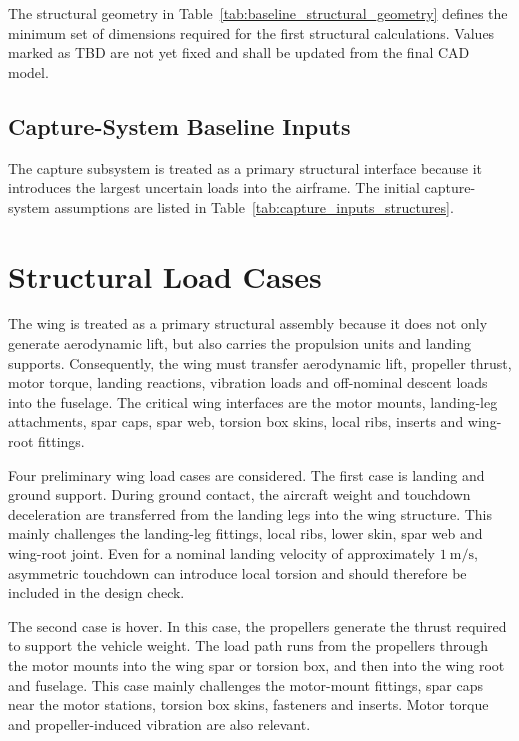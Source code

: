 The structural geometry in Table~\ref{tab:baseline_structural_geometry} defines the minimum set of dimensions required for the first structural calculations. Values marked as TBD are not yet fixed and shall be updated from the final CAD model.




\subsection{Capture-System Baseline Inputs}

The capture subsystem is treated as a primary structural interface because it introduces the largest uncertain loads into the airframe. The initial capture-system assumptions are listed in Table~\ref{tab:capture_inputs_structures}.



\section{Structural Load Cases}


The wing is treated as a primary structural assembly because it does not only generate aerodynamic lift, but also carries the propulsion units and landing supports. Consequently, the wing must transfer aerodynamic lift, propeller thrust, motor torque, landing reactions, vibration loads and off-nominal descent loads into the fuselage. The critical wing interfaces are the motor mounts, landing-leg attachments, spar caps, spar web, torsion box skins, local ribs, inserts and wing-root fittings.

Four preliminary wing load cases are considered. The first case is landing and ground support. During ground contact, the aircraft weight and touchdown deceleration are transferred from the landing legs into the wing structure. This mainly challenges the landing-leg fittings, local ribs, lower skin, spar web and wing-root joint. Even for a nominal landing velocity of approximately \(1~\mathrm{m/s}\), asymmetric touchdown can introduce local torsion and should therefore be included in the design check.

The second case is hover. In this case, the propellers generate the thrust required to support the vehicle weight. The load path runs from the propellers through the motor mounts into the wing spar or torsion box, and then into the wing root and fuselage. This case mainly challenges the motor-mount fittings, spar caps near the motor stations, torsion box skins, fasteners and inserts. Motor torque and propeller-induced vibration are also relevant.

